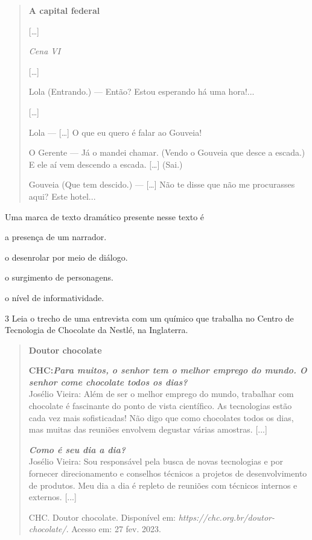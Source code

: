 \begin{quote}
\textbf{A capital federal}

{[}\ldots{}{]}

\textit{Cena VI}

{[}\ldots{}{]}

Lola (Entrando.) --- Então? Estou esperando há uma hora!...

{[}\ldots{}{]}

Lola --- {[}\ldots{}{]} O que eu quero é falar ao Gouveia!

O Gerente --- Já o mandei chamar. (Vendo o Gouveia que desce a escada.)
E ele aí vem descendo a escada. {[}\ldots{}{]} (Sai.)

Gouveia (Que tem descido.) --- {[}\ldots{}{]} Não te disse que não me
procurasses aqui? Este hotel...

\end{quote}

Uma marca de texto dramático presente nesse texto é

\begin{escolha}
\item a presença de um narrador.

\item o desenrolar por meio de diálogo.

\item o surgimento de personagens.

\item o nível de informatividade.
\end{escolha}



\num{3} Leia o trecho de uma entrevista com um químico que
trabalha no Centro de Tecnologia de Chocolate da Nestlé, na Inglaterra.

\begin{quote}
\textbf{Doutor chocolate}

\textbf{CHC:\emph{Para muitos, o senhor tem o melhor emprego do mundo.
O senhor come chocolate todos os dias?}}\\
Josélio Vieira: Além de ser o melhor emprego do mundo, trabalhar com
chocolate é fascinante do ponto de vista científico. As tecnologias
estão cada vez mais sofisticadas! Não digo que como chocolates todos os
dias, mas muitas das reuniões envolvem degustar várias amostras.
{[}...{]}

\emph{\textbf{Como é seu dia a dia?}}\\
Josélio Vieira: Sou responsável pela busca de novas tecnologias e por fornecer
direcionamento e conselhos técnicos a projetos de desenvolvimento de
produtos. Meu dia a dia é repleto de reuniões com técnicos internos e
externos. {[}...{]}

CHC. Doutor chocolate. Disponível em:
\emph{https://chc.org.br/doutor-chocolate/}. Acesso em: 27 fev. 2023.
\end{quote}

